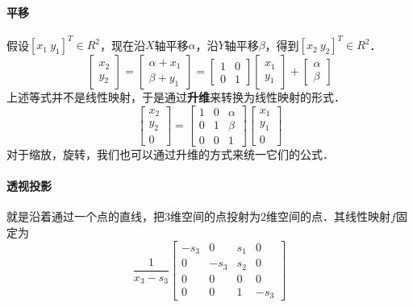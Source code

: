 \documentclass[12pt]{article}
\begin{document}
\begin{CJK}{UTF8}{gbsn}
\paragraph{平移}
假设$[x_1\ y_1]^T \in R^2$，现在沿$X$轴平移$\alpha$，沿$Y$轴平移$\beta$，得到$[x_2\ y_2]^T \in R^2$．
\begin{equation}
\left[
\begin{array}{c}
x_2\\
y_2
\end{array}
\right]
=
\left[
\begin{array}{c}
\alpha + x_1\\
\beta + y_1
\end{array}
\right]
=
\left[
\begin{array}{cc}
1 & 0\\
0 & 1
\end{array}
\right]
\left[
\begin{array}{c}
x_1\\
y_1
\end{array}
\right]
+
\left[
\begin{array}{c}
\alpha\\
\beta
\end{array}
\right]
\end{equation}
上述等式并不是线性映射，于是通过\textbf{升维}来转换为线性映射的形式．
\begin{equation}
\left[
\begin{array}{c}
x_2\\
y_2\\
0
\end{array}
\right]
=
\left[
\begin{array}{ccc}
1 & 0 & \alpha\\
0 & 1 & \beta\\
0 & 0 & 1
\end{array}
\right]
\left[
\begin{array}{c}
x_1\\
y_1\\
0
\end{array}
\right]
\end{equation}
对于缩放，旋转，我们也可以通过升维的方式来统一它们的公式．
\paragraph{透视投影}
就是沿着通过一个点的直线，把$3$维空间的点投射为$2$维空间的点．其线性映射$f$固定为
\begin{equation}
\dfrac{1}{x_3-s_3}\left[
\begin{array}{cccc}
-s_3 & 0 & s_1 & 0\\
0 & -s_3 & s_2 & 0\\
0 & 0 & 0 & 0\\
0 & 0 & 1 & -s_3
\end{array}
\right]
\end{equation}

\end{CJK}
\end{document}
